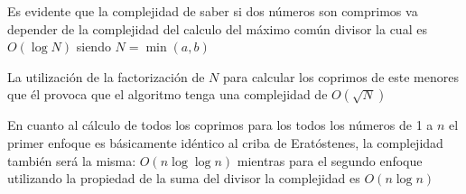 Es evidente que la complejidad de saber si dos números son comprimos va depender de la complejidad del calculo del máximo común divisor la cual es $O(\log N)$ siendo $N = \min (a,b)$

La utilización de la factorización de $N$ para calcular los coprimos de este menores que él provoca que el algoritmo tenga una complejidad  de $O(\sqrt{N})$ 

En cuanto al cálculo de todos los coprimos para los todos los números de 1 a $n$ el primer enfoque es básicamente idéntico al criba de Eratóstenes, la complejidad también será la misma: $O(n \log \log n)$ mientras para el segundo enfoque utilizando la propiedad de la suma del divisor la complejidad es $O(n \log n)$